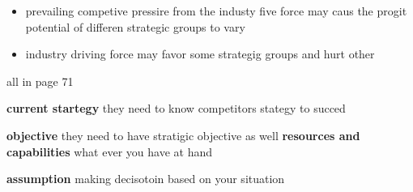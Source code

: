 \documentclass{report}
\begin{document}
\begin{itemize}
\item prevailing competive pressire from the industy five force may caus the progit potential  of differen strategic groups to vary
\item industry driving force may favor some strategig groups and hurt other 



\end{itemize}

all in page 71

\textbf{current startegy}
they need to know competitors stategy to succed 

\textbf{objective}
they need to have stratigic objective as well 
\textbf{resources and capabilities }
what ever you have at hand 

\textbf{assumption}
making decisotoin based on your situation 
\end{document}
